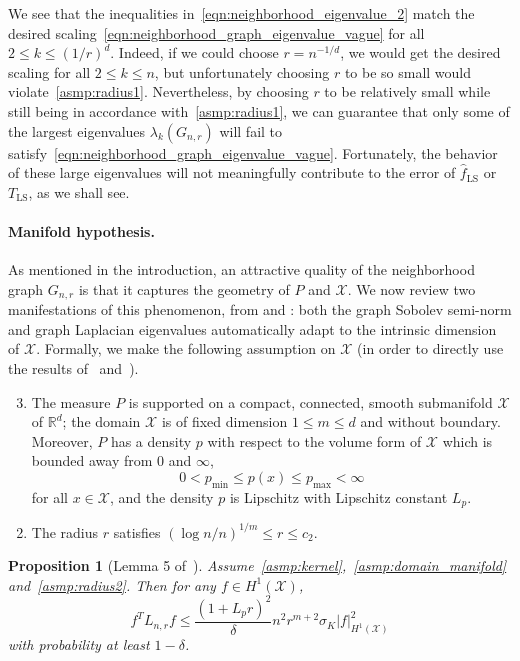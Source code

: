 \documentclass{article}
\newcommand{\Reals}{\mathbb{R}}
\newcommand{\1}{\mathbf{1}}
\newcommand{\Lap}{L}
\newcommand{\Xset}{\mathcal{X}}
\newcommand{\wh}[1]{\widehat{#1}}
\newcommand{\LS}{\mathrm{LS}}
\theoremstyle{alden}
\theoremstyle{aldenthm}
\newtheorem{proposition}{Proposition}
\theoremstyle{definition}
\theoremstyle{remark}
\begin{document}
We see that the inequalities in~\eqref{eqn:neighborhood_eigenvalue_2} match the desired scaling~\eqref{eqn:neighborhood_graph_eigenvalue_vague} for all $2 \leq k \leq (1/r)^d$. Indeed, if we could choose $r = n^{-1/d}$, we would get the desired scaling for all $2 \leq k \leq n$, but unfortunately choosing $r$ to be so small would violate~\ref{asmp:radius1}. Nevertheless, by choosing $r$ to be relatively small while still being in accordance with~\ref{asmp:radius1}, we can guarantee that only some of the largest eigenvalues $\lambda_k(G_{n,r})$ will fail to satisfy~\eqref{eqn:neighborhood_graph_eigenvalue_vague}. Fortunately, the behavior of these large eigenvalues will not meaningfully contribute to the error of $\wh{f}_{\LS}$ or $T_{\LS}$, as we shall see.

\paragraph{Manifold hypothesis.}

As mentioned in the introduction, an attractive quality of the neighborhood graph $G_{n,r}$ is that it captures the geometry of $P$ and $\Xset$. We now review two manifestations of this phenomenon, from \cite{trillos2019} and \cite{calder2019}: both the graph Sobolev semi-norm and graph Laplacian eigenvalues automatically adapt to the intrinsic dimension of $\Xset$. Formally, we make the following assumption on $\Xset$ (in order to directly use the results of~\cite{trillos2019} and~\cite{calder2019}).
\begin{enumerate}[label=(P\arabic*)]
	\setcounter{enumi}{2}
	\item 
	\label{asmp:domain_manifold}
	The measure $P$ is supported on a compact, connected, smooth submanifold $\Xset$ of $\Reals^d$; the domain $\Xset$ is of fixed dimension $1 \leq m \leq d$ and without boundary. Moreover, $P$ has a density $p$ with respect to the volume form of $\Xset$ which is bounded away from $0$ and $\infty$,
	\begin{equation*}
	0 < p_{\min} \leq p(x) \leq p_{\max} < \infty
	\end{equation*}
	for all $x \in \Xset$, and the density $p$ is Lipschitz with Lipschitz constant $L_p$.
\end{enumerate}
\begin{enumerate}[label=(R\arabic*)]
	\setcounter{enumi}{1}
	\item 
	\label{asmp:radius2}
	The radius $r$ satisfies $(\log n/n)^{1/m} \leq r \leq c_2$.
\end{enumerate}
\begin{proposition}[Lemma 5 of~\cite{trillos2019}]
	\label{prop:manifold_graph_sobolev_seminorm}
	Assume~\ref{asmp:kernel},~\ref{asmp:domain_manifold} and~\ref{asmp:radius2}. Then for any $f \in H^1(\Xset)$,
	\begin{equation*}
	f^T \Lap_{n,r} f \leq \frac{(1 + L_pr)^2}{\delta}n^{2}r^{m + 2} \sigma_K |f|_{H^1(\Xset)}^2
	\end{equation*}
	with probability at least $1 - \delta$.
\end{proposition}
\end{document}
